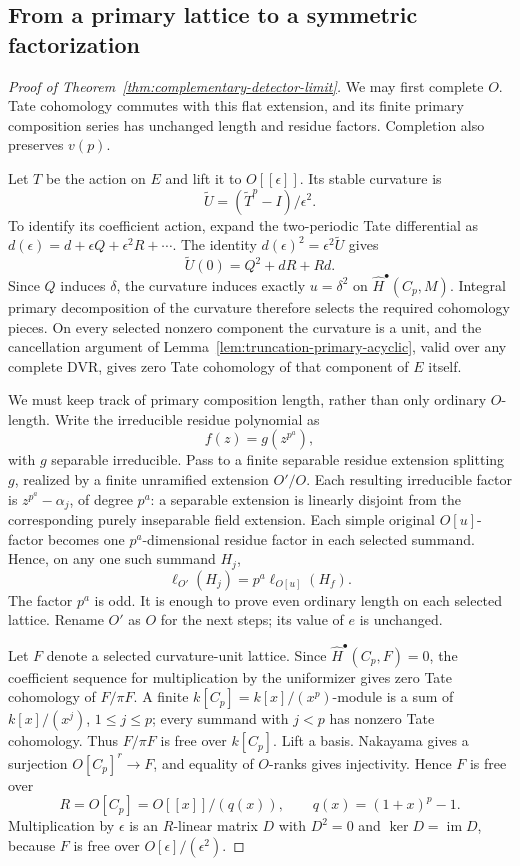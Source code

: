 \subsection{From a primary lattice to a symmetric factorization}

\begin{proof}[Proof of Theorem~\ref{thm:complementary-detector-limit}]
We may first complete $O$.  Tate cohomology commutes with this flat
extension, and its finite primary composition series has unchanged
length and residue factors.  Completion also preserves $v(p)$.

Let $T$ be the action on $E$ and lift it to $O[[\epsilon]]$.
Its stable curvature is
\[
 \widetilde U=(\widetilde T^p-I)/\epsilon^2.
\]
To identify its coefficient action, expand the two-periodic Tate
differential as $d(\epsilon)=d+\epsilon Q+\epsilon^2R+\cdots$.
The identity $d(\epsilon)^2=\epsilon^2\widetilde U$ gives
\[
 \widetilde U(0)=Q^2+dR+Rd.
\]
Since $Q$ induces $\delta$, the curvature induces exactly
$u=\delta^2$ on $\widehat H^\bullet(C_p,M)$.
Integral primary decomposition of the curvature therefore selects
the required cohomology pieces.  On every selected nonzero component
the curvature is a unit, and the cancellation argument of
Lemma~\ref{lem:truncation-primary-acyclic}, valid over any complete
DVR, gives zero Tate cohomology of that component of $E$ itself.

We must keep track of primary composition length, rather than only
ordinary $O$-length.  Write the irreducible residue polynomial as
\[
 f(z)=g(z^{p^a}),
\]
with $g$ separable irreducible.  Pass to a finite separable residue
extension splitting $g$, realized by a finite unramified extension
$O'/O$.  Each resulting irreducible factor is
$z^{p^a}-\alpha_j$, of degree $p^a$: a separable extension is
linearly disjoint from the corresponding purely inseparable field
extension.  Each simple original $O[u]$-factor becomes one
$p^a$-dimensional residue factor in each selected summand.  Hence,
on any one such summand $H_j$,
\[
 \ell_{O'}(H_j)=p^a\ell_{O[u]}(H_f).
\]
The factor $p^a$ is odd.  It is enough to prove even ordinary length
on each selected lattice.  Rename $O'$ as $O$ for the next steps;
its value of $e$ is unchanged.

Let $F$ denote a selected curvature-unit lattice.  Since
$\widehat H^\bullet(C_p,F)=0$, the coefficient sequence for
multiplication by the uniformizer gives zero Tate cohomology of
$F/\pi F$.  A finite $k[C_p]=k[x]/(x^p)$-module is a sum of
$k[x]/(x^j)$, $1\le j\le p$; every summand with $j<p$ has
nonzero Tate cohomology.  Thus $F/\pi F$ is free over $k[C_p]$.
Lift a basis.  Nakayama gives a surjection $O[C_p]^r\to F$, and
equality of $O$-ranks gives injectivity.  Hence $F$ is free over
\[
 R=O[C_p]=O[[x]]/(q(x)),\qquad q(x)=(1+x)^p-1.
\]
Multiplication by $\epsilon$ is an $R$-linear matrix $D$ with
$D^2=0$ and $\ker D=\operatorname{im}D$, because $F$ is free
over $O[\epsilon]/(\epsilon^2)$.


\end{proof}
